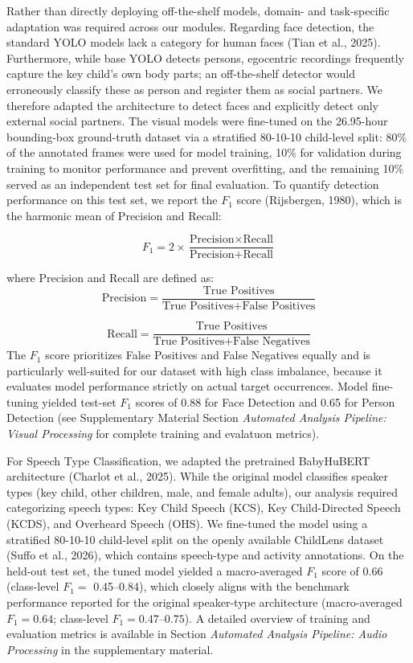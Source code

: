 \documentclass[
  english,
  12pt,
  man,floatsintext]{apa6}
\begin{document}
Rather than directly deploying off-the-shelf models, domain- and task-specific adaptation was required across our modules. Regarding face detection, the standard YOLO models lack a category for human faces (Tian et al., 2025). Furthermore, while base YOLO detects persons, egocentric recordings frequently capture the key child's own body parts; an off-the-shelf detector would erroneously classify these as person and register them as social partners. We therefore adapted the architecture to detect faces and explicitly detect only external social partners. The visual models were fine-tuned on the 26.95-hour bounding-box ground-truth dataset via a stratified 80-10-10 child-level split: 80\% of the annotated frames were used for model training, 10\% for validation during training to monitor performance and prevent overfitting, and the remaining 10\% served as an independent test set for final evaluation. To quantify detection performance on this test set, we report the \(F_1\) score (Rijsbergen, 1980), which is the harmonic mean of Precision and Recall:

\[
F_1 = 2 \times \frac{\text{Precision} \times \text{Recall}}{\text{Precision} + \text{Recall}}
\]

where Precision and Recall are defined as:
\[
\text{Precision} = \frac{\text{True Positives}}
{\text{True Positives} + \text{False Positives}}
\]

\[
\text{Recall} = \frac{\text{True Positives}}
{\text{True Positives} + \text{False Negatives}}
\]
The \(F_1\) score prioritizes False Positives and False Negatives equally and is particularly well-suited for our dataset with high class imbalance, because it evaluates model performance strictly on actual target occurrences. Model fine-tuning yielded test-set \(F_1\) scores of 0.88 for Face Detection and 0.65 for Person Detection (see Supplementary Material Section \emph{Automated Analysis Pipeline: Visual Processing} for complete training and evalatuon metrics).

For Speech Type Classification, we adapted the pretrained BabyHuBERT architecture (Charlot et al., 2025). While the original model classifies speaker types (key child, other children, male, and female adults), our analysis required categorizing speech types: Key Child Speech (KCS), Key Child-Directed Speech (KCDS), and Overheard Speech (OHS). We fine-tuned the model using a stratified 80-10-10 child-level split on the openly available ChildLens dataset (Suffo et al., 2026), which contains speech-type and activity annotations. On the held-out test set, the tuned model yielded a macro-averaged \(F_1\) score of 0.66 (class-level \(F_1 =\) 0.45--0.84), which closely aligns with the benchmark performance reported for the original speaker-type architecture (macro-averaged \(F_1 = 0.64\); class-level \(F_1 = 0.47\text{--}0.75\)). A detailed overview of training and evaluation metrics is available in Section \emph{Automated Analysis Pipeline: Audio Processing} in the supplementary material.
\end{document}
